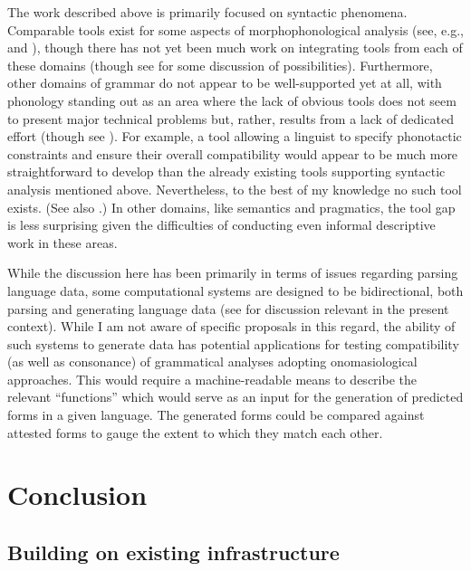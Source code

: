 The work described above is primarily focused on syntactic phenomena. Comparable
tools exist for some aspects of morphophonological analysis (see, e.g.,
\citet{BlackSimons:2008} and \citet{Maxwelltv}), though there has not yet been much work on
integrating tools from each of these domains (though see
 for some discussion of possibilities). Furthermore,
other domains of grammar do not appear to be well-supported yet at all, with
phonology standing out as an area where the lack of obvious tools does not seem
to present major technical problems but, rather, results from a lack of
dedicated effort (though see ). For example, a tool allowing a linguist to specify phonotactic
constraints and ensure their overall compatibility would appear to be much more
straightforward to develop than the already existing tools supporting syntactic
analysis mentioned above. Nevertheless, to the best of my knowledge no such tool
exists. (See also .) In other domains, like semantics and
pragmatics, the tool gap is less surprising given the difficulties of conducting
even informal descriptive work in these areas.

While the discussion here has been primarily in terms of issues regarding
parsing language data, some computational systems are designed to be
bidirectional, both parsing and generating language data (see
 for discussion relevant in the present
context). While I am not aware of specific proposals in this regard, the ability
of such systems to generate data has potential applications for testing
compatibility (as well as consonance) of grammatical analyses adopting
onomasiological approaches. This would require a machine-readable means to
describe the relevant ``functions'' which would serve as an input for the
generation of predicted forms in a given language. The generated forms could be
compared against attested forms to gauge the extent to which they match each
other.



\section{Conclusion\label{Conclusion}}

\subsection{Building on existing infrastructure}

